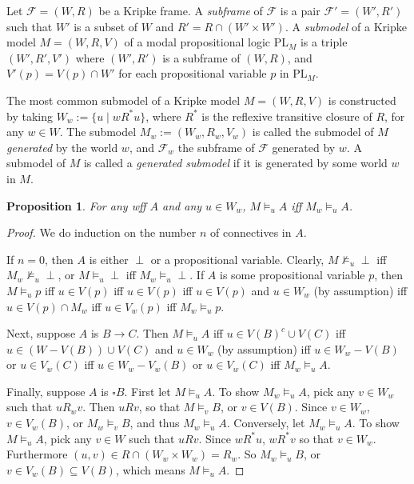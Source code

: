 \documentclass[12pt]{article}
\newtheorem{prop}{Proposition}
\begin{document}
Let $\mathcal{F}=(W,R)$ be a Kripke frame.  A \emph{subframe} of $\mathcal{F}$ is a pair $\mathcal{F}'=(W',R')$ such that $W'$ is a subset of $W$ and $R'=R\cap (W'\times W')$.  A \emph{submodel} of a Kripke model $M=(W,R,V)$ of a modal propositional logic PL$_M$ is a triple $(W',R',V')$ where $(W',R')$ is a subframe of $(W,R)$, and $V'(p)=V(p)\cap W'$ for each propositional variable $p$ in PL$_M$.

The most common submodel of a Kripke model $M=(W,R,V)$ is constructed by taking $W_w:= \lbrace u\mid w R^* u \rbrace$, where $R^*$ is the reflexive transitive closure of $R$, for any $w\in W$.  The submodel $M_w:=(W_w,R_w,V_w)$ is called the submodel of $M$ \emph{generated} by the world $w$, and $\mathcal{F}_w$ the subframe of $\mathcal{F}$ generated by $w$.  A submodel of $M$ is called a \emph{generated submodel} if it is generated by some world $w$ in $M$.

\begin{prop} For any wff $A$ and any $u\in W_w$, $M \models_u A$ iff $M_w \models_u A$. \end{prop}
\begin{proof}  We do induction on the number $n$ of connectives in $A$.  

If $n=0$, then $A$ is either $\perp$ or a propositional variable.  Clearly, $M \not \models_u \perp$ iff $M_w \not \models_u \perp$, or $M \models_u \perp$ iff $M_w \models_u \perp$.  If $A$ is some propositional variable $p$, then $M \models_u p$ iff $u\in V(p)$ iff $u\in V(p)$ iff $u\in V(p)$ and $u\in W_w$ (by assumption) iff $u\in V(p)\cap M_w$ iff $u\in V_w(p)$ iff $M_w \models_u p$.

Next, suppose $A$ is $B\to C$.  Then $M \models_u A$ iff $u \in V(B)^c \cup V(C)$ iff $u \in (W-V(B)) \cup V(C)$ and $u\in W_w$ (by assumption) iff $u\in W_w - V(B)$ or $u\in V_w(C)$ iff $u\in W_w - V_w(B)$ or $u\in V_w(C)$ iff $M_w \models_u A$.

Finally, suppose $A$ is $\square B$.  First let $M \models_u A$.  To show $M_w \models_u A$, pick any $v \in W_w$ such that $u R_w v$.  Then $u R v$, so that $M \models_v B$, or $v\in V(B)$.  Since $v\in W_w$, $v\in V_w(B)$, or $M_w \models_v B$, and thus $M_w \models_u A$.  Conversely, let $M_w \models_u A$.  To show $M \models_u A$, pick any $v \in W$ such that $u R v$.  Since $w R^* u$, $w R^* v$ so that $v\in W_w$.  Furthermore $(u,v) \in R \cap (W_w\times W_w)=R_w$.  So $M_w \models_u B$, or $v \in V_w(B)\subseteq V(B)$, which means $M \models_u A$.
\end{proof}
\end{document}
